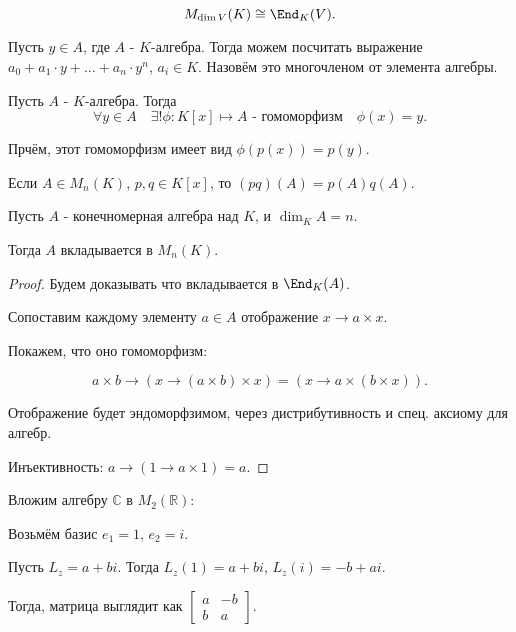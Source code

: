 \begin{example} \thmslashn

    \[ M_{\dim V}(K) \cong \End_{K}(V) .\] 

    Пусть $y\in A$, где $A$ - $K$-алгебра. Тогда можем посчитать выражение $a_0 + a_1 \cdot y + \ldots + a_{n} \cdot y^{n}$, $a_{i}\in K$. Назовём это многочленом от элемента алгебры.
\end{example}
\begin{statement} \thmslashn

    Пусть $A$ - $K$-алгебра. Тогда
    \[ \forall{y\in A}\quad \exists!{\phi : K[x] \mapsto A \text{ - гомоморфизм}}\quad \phi(x) = y .\]

    Прчём, этот гомоморфизм имеет вид $\phi(p(x)) = p(y)$.
\end{statement}
\begin{consequence} \thmslashn

    Если $A\in M_{n}(K)$, $p, q\in K[x]$, то $(pq)(A) = p(A)q(A)$.
\end{consequence}
\begin{theorem} \thmslashn

   Пусть $A$ - конечномерная алгебра над $K$, и $\dim_{K} A = n$.

   Тогда $A$ вкладывается в $M_{n}(K)$.

   \begin{proof} \thmslashn
   
       Будем доказывать что вкладывается в $\End_{K}(A)$.

       Сопоставим каждому элементу $a\in A$ отображение $x \to a \times x$.

       Покажем, что оно гомоморфизм:

        \[ a \times b \to (x \to (a \times b) \times x) = (x \to a \times (b \times x)) .\]

       Отображение будет эндоморфзимом, через дистрибутивность и спец. аксиому для алгебр.

       Инъективность: $a \to (1 \to a \times 1) = a$.
    \end{proof}
\end{theorem}
\begin{example} \thmslashn

    Вложим алгебру $\mathbb{C}$ в $M_{2}(\mathbb{R})$:

    Возьмём базис $e_1=1$, $e_2=i$.

    Пусть $L_{z} = a+bi$. Тогда $L_{z}(1) = a+bi$, $L_{z}(i) = -b+ai$.

    Тогда, матрица выглядит как $\begin{bmatrix} a & -b\\ b & a \end{bmatrix}$. 
\end{example}

